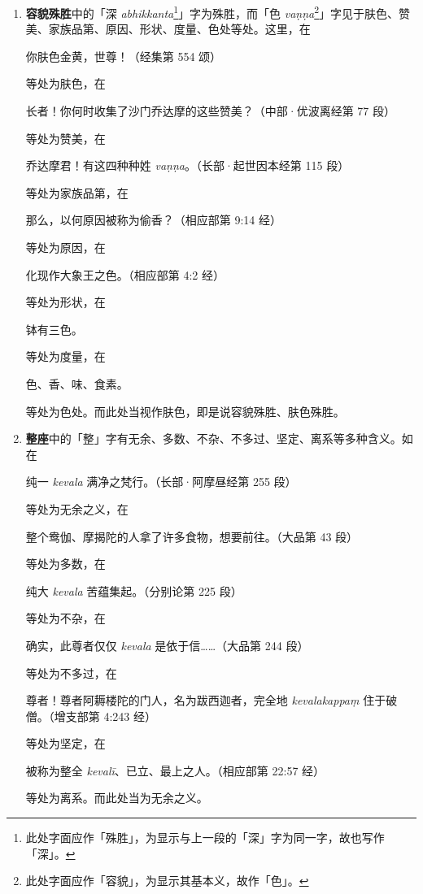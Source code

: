 \begin{enumerate}
\item \textbf{容貌殊胜}中的「深 \textit{abhikkanta}\footnote{此处字面应作「殊胜」，为显示与上一段的「深」字为同一字，故也写作「深」。}」字为殊胜，而「色 \textit{vaṇṇa}\footnote{此处字面应作「容貌」，为显示其基本义，故作「色」。}」字见于肤色、赞美、家族品第、原因、形状、度量、色处等处。这里，在\begin{quoting}你肤色金黄，世尊！（经集第 554 颂）\end{quoting}等处为肤色，在\begin{quoting}长者！你何时收集了沙门乔达摩的这些赞美？（中部·优波离经第 77 段）\end{quoting}等处为赞美，在\begin{quoting}乔达摩君！有这四种种姓 \textit{vaṇṇa}。（长部·起世因本经第 115 段）\end{quoting}等处为家族品第，在\begin{quoting}那么，以何原因被称为偷香？（相应部第 9:14 经）\end{quoting}等处为原因，在\begin{quoting}化现作大象王之色。（相应部第 4:2 经）\end{quoting}等处为形状，在\begin{quoting}钵有三色。\end{quoting}等处为度量，在\begin{quoting}色、香、味、食素。\end{quoting}等处为色处。而此处当视作肤色，即是说容貌殊胜、肤色殊胜。
\item \textbf{整座}中的「整」字有无余、多数、不杂、不多过、坚定、离系等多种含义。如在\begin{quoting}纯一 \textit{kevala} 满净之梵行。（长部·阿摩昼经第 255 段）\end{quoting}等处为无余之义，在\begin{quoting}整个鸯伽、摩揭陀的人拿了许多食物，想要前往。（大品第 43 段）\end{quoting}等处为多数，在\begin{quoting}纯大 \textit{kevala} 苦蕴集起。（分别论第 225 段）\end{quoting}等处为不杂，在\begin{quoting}确实，此尊者仅仅 \textit{kevala} 是依于信……（大品第 244 段）\end{quoting}等处为不多过，在\begin{quoting}尊者！尊者阿耨楼陀的门人，名为跋西迦者，完全地 \textit{kevalakappaṃ} 住于破僧。（增支部第 4:243 经）\end{quoting}等处为坚定，在\begin{quoting}被称为整全 \textit{kevalī}、已立、最上之人。（相应部第 22:57 经）\end{quoting}等处为离系。而此处当为无余之义。

\end{enumerate}
